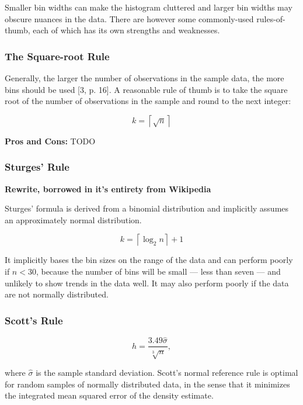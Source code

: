Smaller bin widths can make the histogram cluttered and larger bin widths may obscure nuances in the data. There are however some commonly-used rules-of-thumb, each of which has its own strengths and weaknesses. 

\subsubsection*{The Square-root Rule}

Generally, the larger the number of observations in the sample data, the more bins should be used [3, p. 16]. A reasonable rule of thumb is to take the square root of the number of observations in the sample and round to the next integer:

\begin{equation}
    k = \left \lceil \sqrt{n} \right \rceil 
\end{equation}

\textbf{Pros and Cons:} TODO

\subsubsection{Sturges' Rule}

\textbf{Rewrite, borrowed in it's entirety from Wikipedia}

Sturges' formula is derived from a binomial distribution and implicitly assumes an approximately normal distribution.

\begin{equation}
    k = \left \lceil \log_2 n \right \rceil + 1 
\end{equation}

It implicitly bases the bin sizes on the range of the data and can perform poorly if $n < 30$, because the number of bins will be small — less than seven — and unlikely to show trends in the data well. It may also perform poorly if the data are not normally distributed.

\subsubsection{Scott's Rule}

\begin{equation}
    h = \frac{3.49 \hat{\sigma}}{\sqrt[3]{n}},
\end{equation}

where $\hat{\sigma}$ is the sample standard deviation. Scott's normal reference rule is optimal for random samples of normally distributed data, in the sense that it minimizes the integrated mean squared error of the density estimate. 

